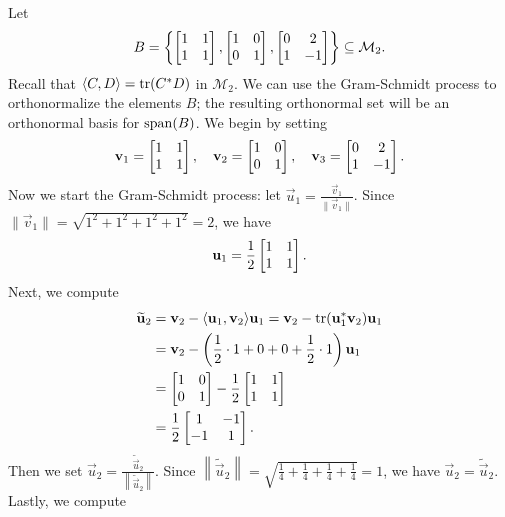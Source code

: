 \documentclass{homework}
\begin{document}
	\maketitle
	
	\question Let
	\begin{equation*}
		B = \left\{\left[\begin{matrix}1 & 1 \\ 1 & 1\end{matrix}\right], \left[\begin{matrix}1 & 0 \\ 0 & 1\end{matrix}\right], \left[\begin{matrix}0 & 2 \\ 1 & -1\end{matrix}\right]\right\} \subseteq \mathcal{M}_2.
	\end{equation*}
	Recall that $\langle C, D \rangle = \mathrm{tr}(C^*D)$ in $\mathcal{M}_2$. We can use the Gram-Schmidt process to orthonormalize the elements $B$; the resulting orthonormal set will be an orthonormal basis for $\mathrm{span}(B)$. We begin by setting
	\begin{equation*}
		\mathbf{v}_1 = \left[\begin{matrix}1 & 1 \\ 1 & 1\end{matrix}\right],\quad\mathbf{v}_2 = \left[\begin{matrix}1 & 0 \\ 0 & 1\end{matrix}\right],\quad\mathbf{v}_3= \left[\begin{matrix}0 & 2 \\ 1 & -1\end{matrix}\right].
	\end{equation*}
	Now we start the Gram-Schmidt process: let $\vec{u}_1 = \frac{\vec{v}_1}{\lVert\vec{v}_1\rVert}$. Since $\lVert \vec{v}_1\rVert = \sqrt{1^2 + 1^2 + 1^2+1^2} = 2$, we have
	\begin{equation*}
		\mathbf{u}_1 = \frac{1}{2}\left[\begin{matrix}1&1\\1&1\end{matrix}\right].
	\end{equation*}
	Next, we compute 
	\begin{equation*}
	\begin{aligned}
		\widetilde{\mathbf{u}}_2 &= \mathbf{v}_2 - \langle \mathbf{u}_1, \mathbf{v}_2\rangle\mathbf{u}_1 =\mathbf{v}_2- \mathrm{tr}(\mathbf{u}_1^*\mathbf{v}_2)\mathbf{u}_1 \\
		&= \mathbf{v}_2 - \left(\frac{1}{2}\cdot 1 + 0 + 0 + \frac{1}{2}\cdot 1\right)\mathbf{u}_1 \\
		&= \left[\begin{matrix}1&0\\0&1\end{matrix}\right] - \frac{1}{2}\left[\begin{matrix}1&1\\1&1\end{matrix}\right] \\
		&= \frac{1}{2}\left[\begin{matrix}1 & -1 \\ -1 & 1\end{matrix}\right].
	\end{aligned}
	\end{equation*}
	Then we set $\vec{u}_2 = \frac{\widetilde{\vec{u}}_2}{\left\lVert\widetilde{\vec{u}}_2\right\rVert}$. Since $\left\lVert\widetilde{\vec{u}}_2\right\rVert = \sqrt{\frac{1}{4} + \frac{1}{4} + \frac{1}{4} + \frac{1}{4}} = 1$, we have $\vec{u}_2 = \widetilde{\vec{u}}_2$. Lastly, we compute
\end{document}
